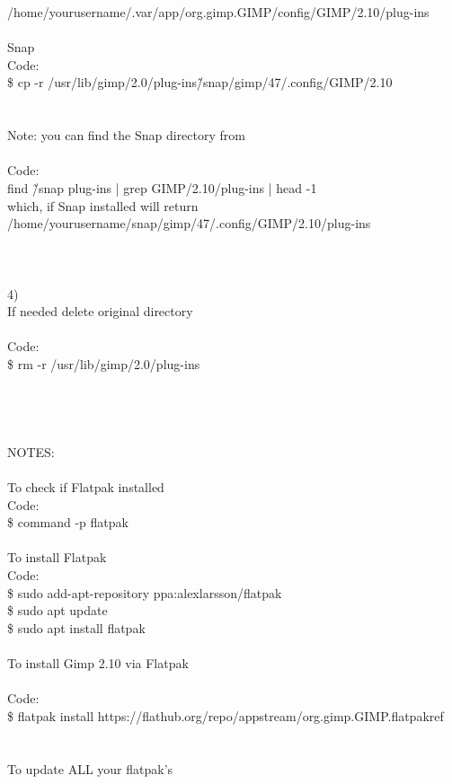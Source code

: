 \documentclass[10pt,a4paper]{article}
\begin{document}
{{{{{{{{{{{{{{{/home/yourusername/.var/app/org.gimp.GIMP/config/GIMP/2.10/plug-ins\\
\\
Snap\\
Code:\\
\$ cp -r /usr/lib/gimp/2.0/plug-ins\~/snap/gimp/47/.config/GIMP/2.10\\
\\
\\
Note: you can find the Snap directory from\\
\\
Code:\\
find \~/snap plug-ins | grep GIMP/2.10/plug-ins | head -1\\
which, if Snap installed will return\\
/home/yourusername/snap/gimp/47/.config/GIMP/2.10/plug-ins\\
\\
\\
\\
4)\\
If needed delete original directory\\
\\
Code:\\
\$ rm -r /usr/lib/gimp/2.0/plug-ins\\
\\
\\
\\
\\
NOTES:\\
\\
To check if Flatpak installed\\
Code:\\
\$ command -p flatpak\\
\\
To install Flatpak\\
Code:\\
\$ sudo add-apt-repository ppa:alexlarsson/flatpak\\
\$ sudo apt update\\
\$ sudo apt install flatpak\\
\\
To install Gimp 2.10 via Flatpak\\
\\
Code:\\
\$ flatpak install https://flathub.org/repo/appstream/org.gimp.GIMP.flatpakref\\
\\
\\
To update ALL your flatpak's\\
}}}}}}}}}}}}}}}
\end{document}
